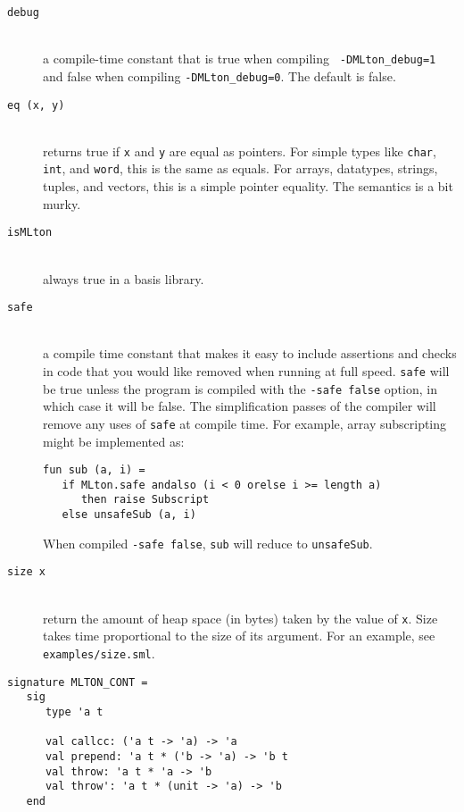 \newcommand{\entry}[1]{\item[\tt #1]\hspace{1in}\\}
\begin{description}

\entry{debug}
a compile-time constant that is true when compiling {\tt
-DMLton\_debug=1} and false when compiling {\tt -DMLton\_debug=0}.
The default is false.

\entry{eq (x, y)}
returns true if {\tt x} and {\tt y} are equal as pointers.  For simple types
like {\tt char}, {\tt int}, and {\tt word}, this is the same as equals.  For
arrays, datatypes, strings, tuples, and vectors, this is a simple pointer
equality.  The semantics is a bit murky.


\entry{isMLton} always true in a {\mlton} basis library.

\entry{safe}
a compile time constant that makes it easy to
include assertions and checks in code that you would like removed when running
at full speed.  {\tt safe} will be true unless the program is compiled with the
{\tt -safe false} option, in which case it will be false.  The simplification
passes of the compiler will remove any uses of {\tt safe} at compile time.  For
example, array subscripting might be implemented as:
\begin{verbatim}
fun sub (a, i) =
   if MLton.safe andalso (i < 0 orelse i >= length a)
      then raise Subscript
   else unsafeSub (a, i)
\end{verbatim}
When compiled {\tt -safe false}, {\tt sub} will reduce to
{\tt unsafeSub}.

\entry{size x}
return the amount of heap space (in bytes) taken by the value of {\tt x}.  Size
takes time proportional to the size of its argument.  For an example, see {\tt
examples/size.sml}.

\end{description}


\begin{verbatim}
signature MLTON_CONT =
   sig
      type 'a t

      val callcc: ('a t -> 'a) -> 'a
      val prepend: 'a t * ('b -> 'a) -> 'b t
      val throw: 'a t * 'a -> 'b
      val throw': 'a t * (unit -> 'a) -> 'b
   end
\end{verbatim}

